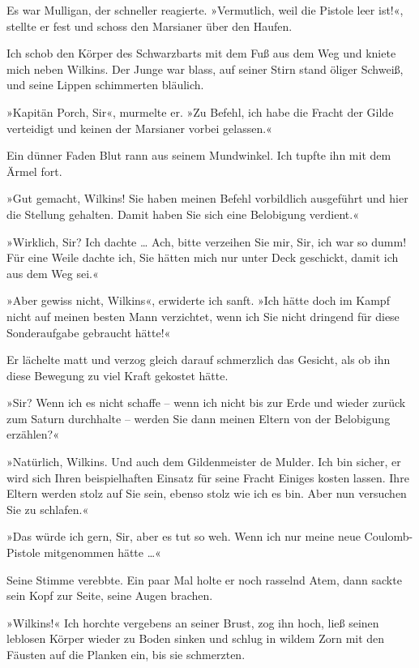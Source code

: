 Es war Mulligan, der schneller reagierte. »Vermutlich, weil die
Pistole leer ist!«, stellte er fest und schoss den Marsianer über
den Haufen.

\bigpar

Ich schob den Körper des Schwarzbarts mit dem Fuß aus dem Weg und
kniete mich neben Wilkins. Der Junge war blass, auf seiner Stirn
stand öliger Schweiß, und seine Lippen schimmerten bläulich.

»Kapitän Porch, Sir«, murmelte er. »Zu Befehl, ich habe die Fracht
der Gilde verteidigt und keinen der Marsianer vorbei gelassen.«

Ein dünner Faden Blut rann aus seinem Mundwinkel. Ich tupfte ihn
mit dem Ärmel fort.

»Gut gemacht, Wilkins! Sie haben meinen Befehl vorbildlich
ausgeführt und hier die Stellung gehalten. Damit haben Sie sich
eine Belobigung verdient.«

»Wirklich, Sir? Ich dachte \ldots{} Ach, bitte verzeihen Sie mir, Sir,
ich war so dumm! Für eine Weile dachte ich, Sie hätten mich nur
unter Deck geschickt, damit ich aus dem Weg sei.«

»Aber gewiss nicht, Wilkins«, erwiderte ich sanft. »Ich hätte doch
im Kampf nicht auf meinen besten Mann verzichtet, wenn ich Sie
nicht dringend für diese Sonderaufgabe gebraucht hätte!«

Er lächelte matt und verzog gleich darauf schmerzlich das Gesicht,
als ob ihn diese Bewegung zu viel Kraft gekostet hätte.

»Sir? Wenn ich es nicht schaffe – wenn ich nicht bis zur Erde und
wieder zurück zum Saturn durchhalte – werden Sie dann meinen Eltern
von der Belobigung erzählen?«

»Natürlich, Wilkins. Und auch dem Gildenmeister de Mulder. Ich bin
sicher, er wird sich Ihren beispielhaften Einsatz für seine Fracht
Einiges kosten lassen. Ihre Eltern werden stolz auf Sie sein,
ebenso stolz wie ich es bin. Aber nun versuchen Sie zu schlafen.«

»Das würde ich gern, Sir, aber es tut so weh. Wenn ich nur meine
neue Coulomb-Pistole mitgenommen hätte \ldots{}«

Seine Stimme verebbte. Ein paar Mal holte er noch rasselnd Atem,
dann sackte sein Kopf zur Seite, seine Augen brachen.

»Wilkins!« Ich horchte vergebens an seiner Brust, zog ihn hoch,
ließ seinen leblosen Körper wieder zu Boden sinken und schlug in
wildem Zorn mit den Fäusten auf die Planken ein, bis sie
schmerzten.

